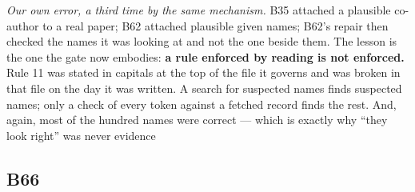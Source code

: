 \documentclass[10pt]{article}
\begin{document}
\begin{description}[leftmargin=0pt,itemsep=1pt]
\item[Note.] \emph{Our own error, a third time by the same mechanism.} B35 attached a plausible co-author to a real paper; B62 attached plausible given names; B62's repair then checked the names it was looking at and not the one beside them. The lesson is the one the gate now embodies: \textbf{a rule enforced by reading is not enforced.} Rule 11 was stated in capitals at the top of the file it governs and was broken in that file on the day it was written. A search for suspected names finds suspected names; only a check of every token against a fetched record finds the rest. And, again, most of the hundred names were correct --- which is exactly why ``they look right'' was never evidence
\end{description}
\subsection*{B66}\label{led:B66}
\end{document}
